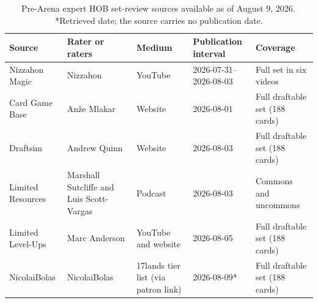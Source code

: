 \documentclass[11pt]{article}
\numberwithin{equation}{section}
\begin{document}
\begin{table}[tb]
\centering
\caption{Pre-Arena expert HOB set-review sources available as of August 9,
2026.\,*Retrieved date; the source carries no publication date.}
\label{tab:hob-expert-sources}
{\small
\setlength{\tabcolsep}{3pt}
\begin{tabular}{L{0.17\textwidth}L{0.215\textwidth}L{0.15\textwidth}
                L{0.225\textwidth}L{0.13\textwidth}}
\toprule
Source & Rater or raters & Medium & Publication interval & Coverage \\
\midrule
Nizzahon Magic & Nizzahon & YouTube & 2026-07-31--2026-08-03 & Full set in six videos \\
\addlinespace
Card Game Base & An\v{z}e Mlakar & Website & 2026-08-01 & Full draftable set (188 cards) \\
\addlinespace
Draftsim & Andrew Quinn & Website & 2026-08-03 & Full draftable set (188 cards) \\
\addlinespace
Limited Resources & Marshall Sutcliffe and Luis Scott-Vargas & Podcast & 2026-08-03 & Commons and uncommons \\
\addlinespace
Limited Level-Ups & Marc Anderson & YouTube and website & 2026-08-05 & Full draftable set (188 cards) \\
\addlinespace
NicolaiBolas & NicolaiBolas & 17lands tier list (via patron link) & 2026-08-09* & Full draftable set (188 cards) \\
\bottomrule
\end{tabular}
}
\end{table}
\end{document}
